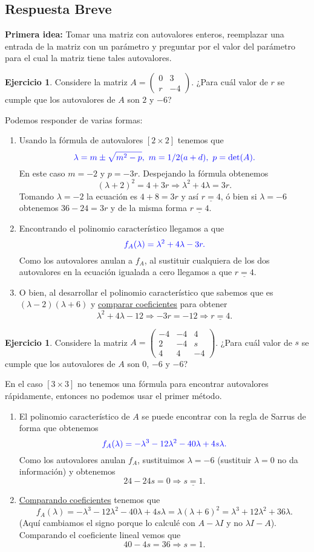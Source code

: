 \documentclass[12pt]{article}
\theoremstyle{plain}
\theoremstyle{definition}
\newtheorem{Ej}[Th]{Ejercicio}         %
\theoremstyle{remark}
\newcommand{\la}{\lambda}           %
\newcommand{\x}{\times}             %
\renewcommand{\:}{\colon}           %
\newcommand{\un}[1]{\underline{#1}}
\renewcommand{\.}{\Cdot}                %
\newcommand{\twobytwo}[4]{\begin{pmatrix} %
    #1 & #2 \\ #3 & #4 \end{pmatrix}}
\newcommand{\threebythree}[9]{\begin{pmatrix} %
  #1 & #2 & #3 \\ #4 & #5 & #6 \\ #7 & #8 & #9 \end{pmatrix}}
\newcommand{\To}{\Rightarrow}
\newcommand{\blu}[1]{\textcolor{blue}{#1}}
\begin{document}
\subsection*{Respuesta Breve}

\textbf{Primera idea:} Tomar una matriz con autovalores enteros, reemplazar una entrada de la matriz con un parámetro y preguntar por el valor del parámetro para el cual la matriz tiene tales autovalores. 

\begin{Ej}
Considere la matriz $A=\twobytwo{0}{3}{r}{-4}$. ¿Para cuál valor de $r$ se cumple que los autovalores de $A$ son $2$ y $-6$?
\end{Ej}

Podemos responder de varias formas:

\begin{enumerate}
  \item Usando la fórmula de autovalores $[2\x 2]$ tenemos que 
  $$\blu{\la=m\pm\sqrt{m^2-p},\ m=1/2(a+d),\ p=\det(A).}$$
  En este caso $m=-2$ y $p=-3r$. Despejando la fórmula obtenemos 
  $$(\la+2)^2=4+3r\To \la^2+4\la=3r.$$
  Tomando $\la=-2$ la ecuación es $4+8=3r$ y así $\un{r=4}$, ó bien si $\la=-6$ obtenemos $36-24=3r$ y de la misma forma $\un{r=4}$.
  \item Encontrando el polinomio característico llegamos a que 
  $$\blu{f_A(\la)=\la^2+4\la-3r.}$$
  Como los autovalores anulan a $f_A$, al sustituir cualquiera de los dos autovalores en la ecuación igualada a cero llegamos a que $\un{r=4}$. 
  \item O bien, al desarrollar el polinomio característico que sabemos que es $(\la-2)(\la+6)$ y \un{comparar coeficientes} para obtener
  $$\la^2+4\la-12\To -3r=-12\To \un{r=4}.$$
\end{enumerate}

\begin{Ej}
Considere la matriz $A=\threebythree{-4}{-4}{4}{2}{-4}{s}{4}{4}{-4}$. ¿Para cuál valor de $s$ se cumple que los autovalores de $A$ son $0$, $-6$ y $-6$?
\end{Ej}

En el caso $[3\x 3]$ no tenemos una fórmula para encontrar autovalores rápidamente, entonces no podemos usar el primer método.

\begin{enumerate}
  \item El polinomio característico de $A$ se puede encontrar con la regla de Sarrus de forma que obtenemos 
  $$\blu{f_A(\la)=-\la^3-12\la^2-40\la+4s\la.}$$
  Como los autovalores anulan $f_A$, sustituimos $\la=-6$ (sustituir $\la=0$ no da información) y obtenemos 
  $$24-24s=0\To \un{s=1}.$$
  \item \un{Comparando coeficientes} tenemos que 
  $$f_A(\la)=-\la^3-12\la^2-40\la+4s\la=\la(\la+6)^2=\la^3+12\la^2+36\la.$$
  (Aquí cambiamos el signo porque lo calculé con $A-\la I$ y no $\la I-A$). Comparando el coeficiente lineal vemos que 
  $$40-4s=36\To s=1.$$
\end{enumerate}
\end{document}

